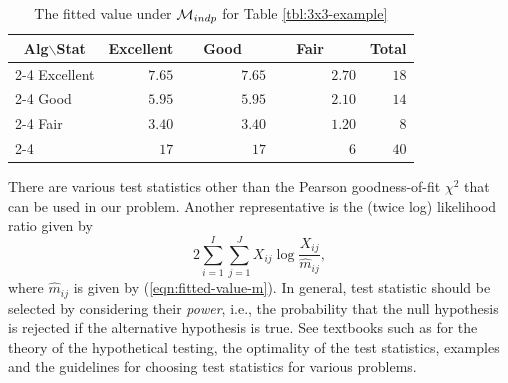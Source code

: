 \documentclass[12pt]{article}
\theoremstyle{definition}
\begin{document}
\begin{table}[h]
\begin{center}
\caption{The fitted value under ${\cal M}_{indp}$ for Table
 \ref{tbl:3x3-example}}
\label{tbl:mle-3x3-example}
\begin{tabular}{l|r|r|r|r}
\multicolumn{1}{c}{Alg$\backslash$Stat} & \multicolumn{1}{c}{Excellent} & 
\multicolumn{1}{c}{\ \ Good\ \ \ } & \multicolumn{1}{c}{\ \ Fair\ \ \ \
 } & \multicolumn{1}{c}{Total}\\ \cline{2-4} 
Excellent & $7.65$ & $7.65$ & $2.70$ & $18$\\ \cline{2-4}
Good      & $5.95$  & $5.95$ & $2.10$ & $14$\\ \cline{2-4}
Fair      & $3.40$  & $3.40$ & $1.20$ & $8$\\ \cline{2-4}
\multicolumn{1}{l}{Total} & \multicolumn{1}{r}{$17$} &
	 \multicolumn{1}{r}{$17$} &
	     \multicolumn{1}{r}{$6$} & \multicolumn{1}{r}{$40$}
\end{tabular}
\end{center}
\end{table}

There are various test statistics other than the Pearson goodness-of-fit
$\chi^2$ that can be used in our problem. Another representative is the
(twice log) likelihood ratio given by
\begin{equation}
 2\sum_{i = 1}^I\sum_{j = 1}^JX_{ij}\log\frac{X_{ij}}{\hat{m}_{ij}},
\label{eqn:likelihood-ratio}
\end{equation}
where $\hat{m}_{ij}$ is given by (\ref{eqn:fitted-value-m}). In general, test
statistic should be selected by considering their {\it power}, i.e.,
the probability that the null hypothesis is rejected if the alternative
hypothesis is true. See textbooks such as \cite{Lehmann-TSH}
for the theory of the hypothetical testing, 
the optimality of the test statistics, examples and
the guidelines for choosing test statistics for various problems. 
\end{document}

